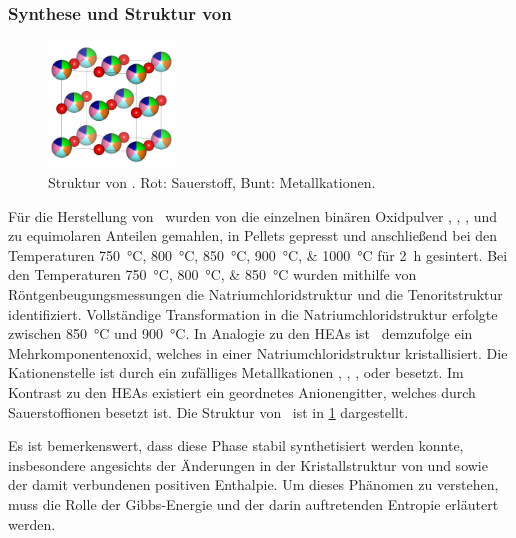 \subsubsection{Synthese und Struktur von \heo}\label{subsubsec:heo}
\begin{figure}
    \centering
    \includegraphics[width=0.3\textwidth]{../assets/theorie/heo}
    \caption{Struktur von \heo. Rot: Sauerstoff, Bunt: Metallkationen.}
    \label{fig:heo}
\end{figure}
Für die Herstellung von \heo\ wurden von  die einzelnen binären Oxidpulver , ,
,  und  zu equimolaren Anteilen gemahlen, in Pellets gepresst und anschließend bei den
Temperaturen \qtylist{750;800;850;900;1000}{\celsius} für \qty{2}{\hour} gesintert.
Bei den Temperaturen \qtylist{750;800;850}{\celsius} wurden mithilfe von Röntgenbeugungsmessungen die
Natriumchloridstruktur und die Tenoritstruktur identifiziert.
Vollständige Transformation in die Natriumchloridstruktur erfolgte zwischen \qty{850}{\celsius} und \qty{900}{\celsius}.
In Analogie zu den HEAs ist \heo\ demzufolge ein Mehrkomponentenoxid, welches in einer Natriumchloridstruktur
kristallisiert.
Die Kationenstelle ist durch ein zufälliges Metallkationen , , ,
 oder  besetzt.
Im Kontrast zu den HEAs existiert ein geordnetes Anionengitter, welches durch Sauerstoffionen besetzt ist.
Die Struktur von \heo\ ist in \cref{fig:heo} dargestellt.\autocite[5]{Rost2015}

Es ist bemerkenswert, dass diese Phase stabil synthetisiert werden konnte, insbesondere angesichts der Änderungen in der
Kristallstruktur von  und  sowie der damit verbundenen positiven Enthalpie.
Um dieses Phänomen zu verstehen, muss die Rolle der Gibbs-Energie und der darin auftretenden Entropie
erläutert werden.

